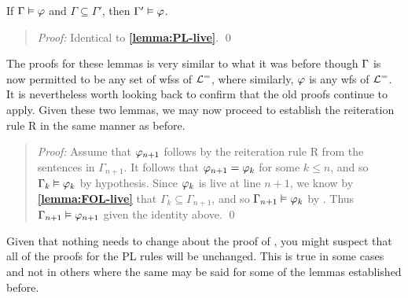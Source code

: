 \begin{Lthm} \label{lemma:FOL-live}
  If $\Gamma \vDash \varphi$ and $\Gamma \subseteq \Gamma'$, then $\Gamma' \vDash \varphi$.
\end{Lthm}

\begin{quote} 
  \textit{Proof:}
  Identical to \textbf{\ref{lemma:PL-live}}.
  \qed
\end{quote}


The proofs for these lemmas is very similar to what it was before though $\Gamma$ is now permitted to be any set of wfss of $\mathcal{L}^{=}$, where similarly, $\varphi$ is any wfs of $\mathcal{L}^{=}$. 
It is nevertheless worth looking back to confirm that the old proofs continue to apply.
Given these two lemmas, we may now proceed to establish the reiteration rule R in the same manner as before.


\begin{quote} 
  \textit{Proof:} Assume that $\varphi_{n+1}$ follows by the reiteration rule R from the sentences in $\Gamma_{n+1}$.
  It follows that $\varphi_{n+1}=\varphi_{k}$ for some $k\leq n$, and so $\Gamma_k \vDash \varphi_k$ by hypothesis.
  Since $\varphi_k$ is live at line $n+1$, we know by \textbf{\ref{lemma:FOL-live}} that $\Gamma_k\subseteq \Gamma_{n+1}$, and so $\Gamma_{n+1} \vDash \varphi_{k}$ by .
  Thus $\Gamma_{n+1} \vDash \varphi_{n+1}$ given the identity above.
  \qed
\end{quote}


Given that nothing needs to change about the proof of , you might suspect that all of the proofs for the PL rules will be unchanged.
This is true in some cases and not in others where the same may be said for some of the lemmas established before.




